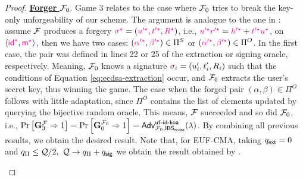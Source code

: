 \documentclass[version=submission, floatrow]{iacrcc}
\begin{document}
\begin{proof}
   \noindent\underline{\textbf{Forger} $\mathcal{F}_{0}$}. Game $3$ relates to the case where $\mathcal{F}_{0}$ tries to break the key-only unforgeability of our scheme. The argument is analogue to the one in \cite{CCS:FerKilPoe16}: assume $\mathcal{F}$ produces a forgery $\textcolor{magenta}{\sigma^{\star}} = \left(\textcolor{magenta}{u'^{\star}}, \textcolor{magenta}{t'^{\star}}, \textcolor{magenta}{R^{\star}}\right)$, i.e.,  $\textcolor{magenta}{u'^{\star}}\textcolor{magenta}{r'^{\star}} = \textcolor{magenta}{h'^{\star}} + \textcolor{magenta}{t'^{\star}}\textcolor{magenta}{u^{\star}}$, on $\Braket{\textcolor{magenta}{\mathsf{id}_{}^{\star}}, \textcolor{magenta}{\mathsf{m}_{}^{\star}}}$, then we have two cases: $\left(\textcolor{magenta}{\alpha'^{\star}}, \textcolor{magenta}{\beta'^{\star}}\right) \in \Pi^{S}$ or $\left(\textcolor{magenta}{\alpha'^{\star}}, \textcolor{magenta}{\beta'^{\star}}\right) \in \Pi^{O}$. In the first case, the pair was defined in lines 22 or 25 of the extraction or signing oracle, respectively. Meaning, $\mathcal{F}_{0}$ knows a signature $\Signature{i} = \left(u'_{i}, t'_{i}, R_{i}\right)$ such that the conditions of Equation \ref{eq:ecdsa-extraction} occur, and $\mathcal{F}_{0}$ extracts the user's secret key, thus winning the game. The case when the forged pair $(\alpha, \beta) \in \Pi^{O}$ follows with little adaptation, since $\Pi^{O}$ contains the list of elements updated by querying the bijective random oracle. This means, $\mathcal{F}$ succeeded and so did $\mathcal{F}_{0}$, i.e., $\mathrm{Pr}\left[\mathbf{G}_{3}^{\mathcal{F}} \Rightarrow 1\right] = \mathrm{Pr}\left[\mathbf{G}_{0}^{\mathcal{F}_{0}} \Rightarrow 1\right] = \mathsf{Adv}_{\mathcal{F}_{0}, \mathsf{IBS}_{\mathsf{ecdsa}}}^{\mathsf{uf}\text{-}\mathsf{id}\text{-}\mathsf{koa}}(\lambda)$. By combining all previous results, we obtain the desired result. Note that, for EUF-CMA, taking $q_{\mathsf{ext}} = 0$ and $q_{\Pi}\le \mathcal{Q}/2,\ \mathcal{Q} \rightarrow q_{\Pi} + \SignatureQueries$ we obtain the result obtained by \cite{CCS:FerKilPoe16}.
    \begin{figure}[H]
        \centering
        \begin{pchstack}[center, boxed, space=1em]
\end{pchstack}
\end{figure}
\end{proof}
\end{document}
